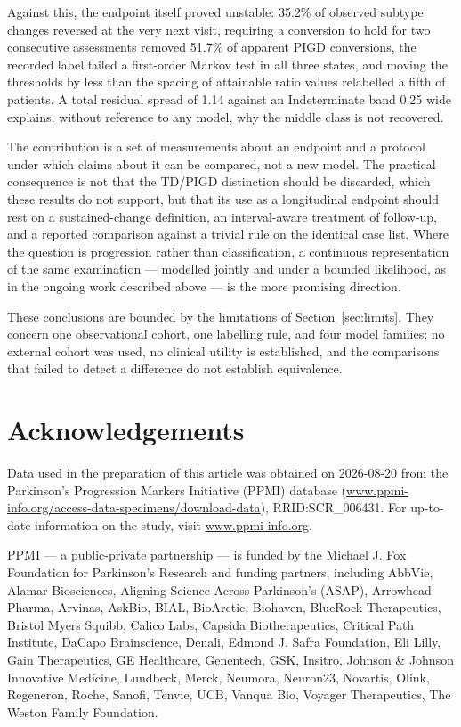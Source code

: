 \documentclass[11pt]{article}
\begin{document}
Against this, the endpoint itself proved unstable: 35.2\% of observed subtype
changes reversed at the very next visit, requiring a conversion to hold for two
consecutive assessments removed 51.7\% of apparent PIGD conversions, the
recorded label failed a first-order Markov test in all three states, and moving
the thresholds by less than the spacing of attainable ratio values relabelled a
fifth of patients. A total residual spread of 1.14 against an Indeterminate band
0.25 wide explains, without reference to any model, why the middle class is not
recovered.

The contribution is a set of measurements about an endpoint and a protocol under
which claims about it can be compared, not a new model. The practical
consequence is not that the TD/PIGD distinction should be discarded, which these
results do not support, but that its use as a longitudinal endpoint should rest
on a sustained-change definition, an interval-aware treatment of follow-up, and
a reported comparison against a trivial rule on the identical case list. Where
the question is progression rather than classification, a continuous
representation of the same examination --- modelled jointly and under a bounded
likelihood, as in the ongoing work described above --- is the more promising
direction.

These conclusions are bounded by the limitations of Section~\ref{sec:limits}.
They concern one observational cohort, one labelling rule, and four model
families; no external cohort was used, no clinical utility is established, and
the comparisons that failed to detect a difference do not establish equivalence.

\section*{Acknowledgements}

Data used in the preparation of this article was obtained on 2026-08-20 from the
Parkinson's Progression Markers Initiative (PPMI) database
(\url{www.ppmi-info.org/access-data-specimens/download-data}),
RRID:SCR\_006431. For up-to-date information on the study, visit
\url{www.ppmi-info.org}.

PPMI --- a public-private partnership --- is funded by the Michael J. Fox
Foundation for Parkinson's Research and funding partners, including AbbVie,
Alamar Biosciences, Aligning Science Across Parkinson's (ASAP), Arrowhead
Pharma, Arvinas, AskBio, BIAL, BioArctic, Biohaven, BlueRock Therapeutics,
Bristol Myers Squibb, Calico Labs, Capsida Biotherapeutics, Critical Path
Institute, DaCapo Brainscience, Denali, Edmond J. Safra Foundation, Eli Lilly,
Gain Therapeutics, GE Healthcare, Genentech, GSK, Insitro, Johnson \& Johnson
Innovative Medicine, Lundbeck, Merck, Neumora, Neuron23, Novartis, Olink,
Regeneron, Roche, Sanofi, Tenvie, UCB, Vanqua Bio, Voyager Therapeutics, The
Weston Family Foundation.
\end{document}
